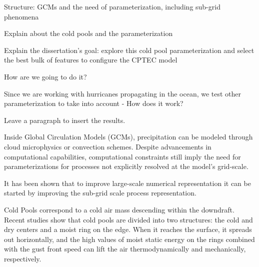 
\begin{resumo}



Structure:
GCMs and the need of parameterization, including sub-grid phenomena

Explain about the cold pools and the parameterization

Explain the dissertation’s goal: explore this cold pool parameterization and select the best bulk of features to configure the CPTEC model

How are we going to do it? 

Since we are working with hurricanes propagating in the ocean, we test other parameterization to take into account - How does it work?

Leave a paragraph to insert the results.


Inside Global Circulation Models (GCMs), precipitation can be modeled through cloud microphysics or convection schemes. Despite advancements in computational capabilities, computational constraints still imply the need for parameterizations for processes not explicitly resolved at the model's grid-scale.%


It has been shown that to improve large-scale numerical representation it can be started by improving the sub-grid scale process representation. %



Cold Pools correspond to a cold air mass descending within the downdraft. Recent studies show that cold pools are divided into two structures: the cold and dry centers and a moist ring on the edge. When it reaches the surface, it spreads out horizontally, and the high values of moist static energy on the rings combined with the gust front speed can lift the air thermodynamically and mechanically, respectively. 


\end{resumo}
